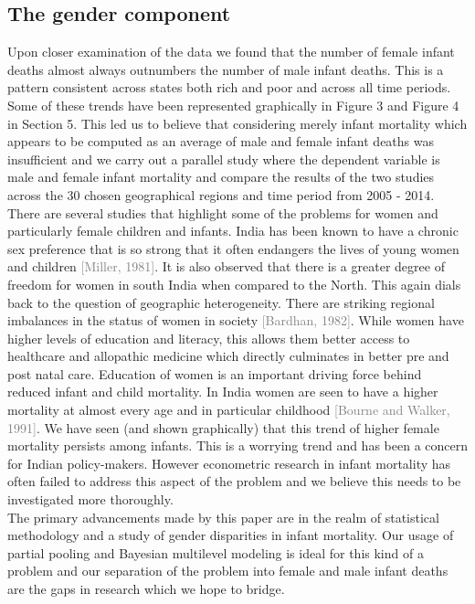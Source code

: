 \documentclass{article}
\begin{document}
\subsection{The gender component}
Upon closer examination of the data we found that the number of female infant deaths almost always outnumbers the number of male infant deaths. This is a pattern consistent across states both rich and poor and across all time periods. Some of these trends have been represented graphically in Figure 3 and Figure 4 in Section 5. This led us to believe that considering merely infant mortality which appears to be computed as an average of male and female infant deaths was insufficient and we carry out a parallel study where the dependent variable is male and female infant mortality and compare the results of the two studies across the 30 chosen geographical regions and time period from 2005 - 2014. \\
There are several studies that highlight some of the problems for women and particularly female children and infants. India has been known to have a chronic sex preference that is so strong that it often endangers the lives of young women and children \textcolor{gray}{[Miller, 1981]}. It is also observed that there is a greater degree of freedom for women in south India when compared to the North. This again dials back to the question of geographic heterogeneity. There are striking regional imbalances in the status of women in society \textcolor{gray}{[Bardhan, 1982]}. While women have higher levels of education and literacy, this allows them better access to healthcare and allopathic medicine which directly culminates in better pre and post natal care. Education of women is an important driving force behind reduced infant and child mortality. In India women are seen to have a higher mortality at almost every age and in particular childhood \textcolor{gray}{[Bourne and Walker, 1991]}. We have seen (and shown graphically) that this trend of higher female mortality persists among infants. This is a worrying trend and has been a concern for Indian policy-makers. However econometric research in infant mortality has often failed to address this aspect of the problem and we believe this needs to be investigated more thoroughly.\\

The primary advancements made by this paper are in the realm of statistical methodology and a study of gender disparities in infant mortality. Our usage of partial pooling and Bayesian multilevel modeling is ideal for this kind of a problem and our separation of the problem into female and male infant deaths are the gaps in research which we hope to bridge.
\end{document}
